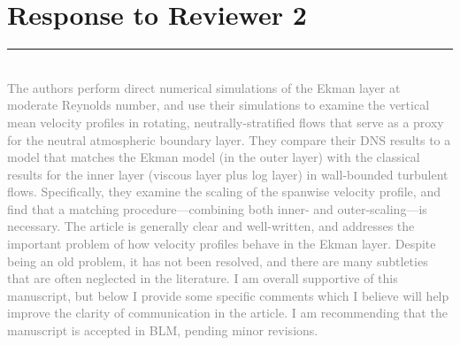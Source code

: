 \documentclass[a4paper,10pt]{article}
\newcommand{\revpoint}[3] 
{ \hrule ~\\[0.5em]
\noindent\textcolor{gray}{\noindent#1} \\[0.5em]  
\noindent\textcolor{blue}{\textit{\noindent#2}} \\[0.5em]
\noindent\textcolor{black}{\noindent{#3}} \\[0.5em]
}
\begin{document}
\section*{Response to Reviewer 2}
\revpoint{The authors perform direct numerical simulations of the Ekman layer at moderate Reynolds number, and use their simulations to examine the vertical mean velocity profiles in rotating, neutrally-stratified flows that serve as a proxy for the neutral atmospheric boundary layer. They compare their DNS results to a model that matches the Ekman model (in the outer layer) with the classical results for the inner layer (viscous layer plus log layer) in wall-bounded turbulent flows. Specifically, they examine the scaling of the spanwise velocity profile, and find that a matching procedure—combining both inner- and outer-scaling—is necessary. The article is generally clear and well-written, and addresses the important problem of how velocity profiles behave in the Ekman layer. Despite being an old problem, it has not been resolved, and there are many subtleties that are often neglected in the literature. I am overall supportive of this manuscript, but below I provide some specific comments which I believe will help improve the clarity of communication in the article. I am recommending that the manuscript is accepted in BLM, pending minor revisions. }{}{}
\end{document}
